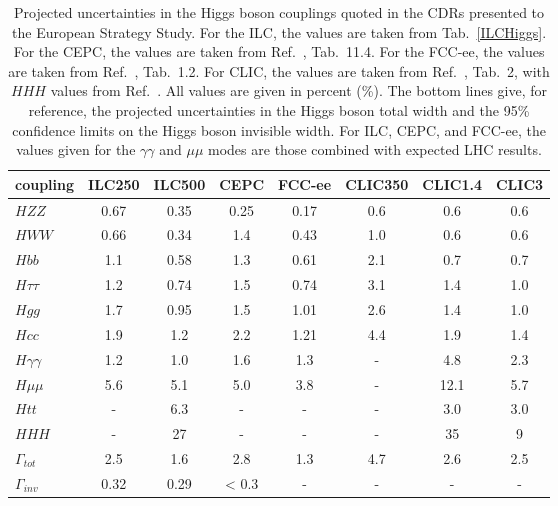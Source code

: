 \begin{table}[!htbp]
\begin{center}
\begin{tabular}{l|cc|c|c|ccc}
   coupling     &  ILC250      &   ILC500   & CEPC &  FCC-ee &
   CLIC350 & 
   CLIC1.4 & CLIC3 \\  \hline 
$HZZ$            &             0.67&   0.35    &   0.25   & 0.17     &  0.6     &     0.6    &   0.6     \\ 
$HWW$            &         0.66  &   0.34   &   1.4   &   0.43   &   1.0    &   0.6  &  0.6 \\ 
 $Hbb$            &              1.1  &  0.58   &  1.3    &    0.61  &   2.1    &  0.7  &  0.7 \\ 
$H\tau\tau$    &          1.2  &   0.74   &   1.5   &  0.74    &   3.1    &  1.4  &  1.0 \\ 
$Hgg$ &                      1.7  & 0.95       &  1.5    &  1.01    &   2.6    &   1.4   &  1.0  \\ 
$Hcc$                       &   1.9  &  1.2   &   2.2   &   1.21   &    4.4   &  1.9  &  1.4 \\ 
$H\gamma\gamma$ &  1.2 &   1.0     &  1.6    &   1.3   &    -   &  4.8  &  2.3 \\ 
$H\mu\mu$                &  5.6  &  5.1     &  5.0    &  3.8    &    -
& 12.1 &  5.7 \\ 
$Htt$  &                       -     &      6.3     &  -    &  -    &
-    & 3.0  &  3.0  \\ 
$HHH$                         &  -    &   27     &   -   &   -   &   -
& 35 &  9 \\ \hline 
$\Gamma_{tot}$             & 2.5  & 1.6    &   2.8    &  1.3     &
4.7    & 2.6  & 2.5 \\  
$\Gamma_{inv}$          &   0.32  & 0.29    &  < 0.3    &   -   &   -
& -  & - \\  \hline
\end{tabular}
\end{center}
\caption{ \label{tab:askthem}    Projected uncertainties in the Higgs
  boson couplings quoted in the CDRs presented to the European
  Strategy Study.  For the ILC, the  values are taken from
  Tab.~\ref{ILCHiggs}.    For the CEPC, the values are taken from
  Ref.~\cite{CEPCStudyGroup:2018ghi}, Tab.~11.4.  For the FCC-ee, the values are taken
  from Ref.~\cite{Benedikt:2018qee}, Tab.~1.2.  For CLIC, the values are taken from 
Ref.~\cite{Charles:2018vfv}, Tab.~2, with $HHH$ values from
Ref.~\cite{Roloff:2019crr}.
  All values
  are given in percent (\%). The
  bottom lines give, for reference, the projected uncertainties in the
  Higgs boson total width and the 95\% confidence limits on the Higgs
  boson invisible width.  For  ILC, CEPC, and FCC-ee, the 
 values given for the $\gamma\gamma$ and $\mu\mu$ modes are those
 combined with expected
LHC results.}
\end{table}



